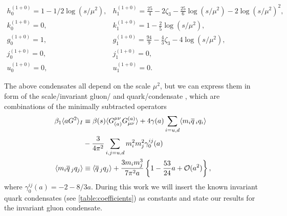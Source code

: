 \documentclass[../../index.tex]{subfiles}
\begin{document}
\begin{equation}
  \begin{array}{ll}
    h_0^{(1+0)}=1-1/2 \log(s/\mu^2), & h_1^{(1+0)}=\frac{25}{4}-2\zeta_3-\frac{25}{6}\log(s/\mu^2)-2 \log(s/\mu^2)^2, \\
    k_0^{(1+0)}=0, & k_1^{(1+0)}=1-\frac{2}{5}\log(s/\mu^2), \\
    g_0^{(1+0)}=1, & g_1^{(1+0)}=\frac{94}{9}-\frac{4}{3}\zeta_3-4 \log(s/\mu^2), \\
    j_0^{(1+0)}=0, & j_1^{(1+0)}=0, \\
    u_0^{(1+0)}=0, & u_1^{(1+0)}=0.
  \end{array}
\end{equation}

The above condensates all depend on the scale \(\mu^2\), but we can express them
in form of the scale\-/invariant gluon\-/ and quark\-/condensate
\cite{Spiridonov1988}, which are combinations of the minimally subtracted
operators
\begin{align}
  \beta_1 \langle a G^2 \rangle_I
  &\equiv \beta(s) \langle
    G_{(a)}^{\mu\nu}G_{\mu\nu}^{(a)} \rangle + 4 \gamma(a) \sum_{i=u,d} \langle
    m_i \overline{q}\,_i q_i \rangle \nonumber \\ 
  &- \frac{3}{4\pi^2} \sum_{i,j=u,d} m_i^2m_j^2
    \gamma_0^{ij}(a) \\
  \langle  m_i \overline{q}\,_j q_j \rangle
  &\equiv \langle \overline{q}\,_j q_j \rangle
    +\frac{3 m_i m_j^3}{7 \pi^2 a} \left\{ 1 - \frac{53}{24}a + \mathcal{O}(a^2) \right\},
\end{align}
where \(\gamma_0^{ij}(a) = -2 - 8/3 a\).
During this work we will insert the known invariant quark condensates (see \cref{table:coefficients}) as
constants and state our results for the invariant gluon condensate.
\end{document}
